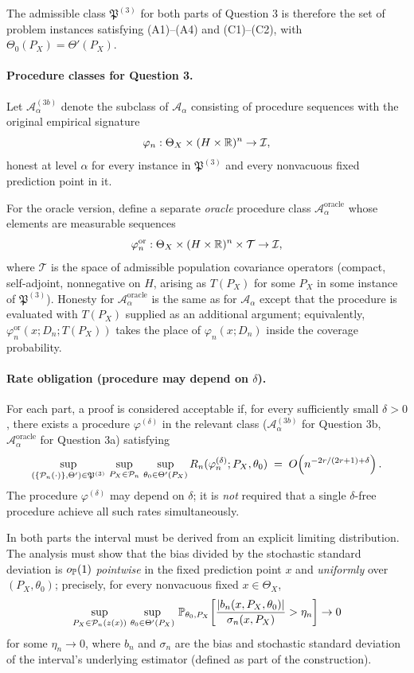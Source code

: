 \documentclass{article}
\begin{document}
The admissible class \(\mathfrak P^{(3)}\) for both parts of Question 3
is therefore the set of problem instances satisfying (A1)--(A4) and
(C1)--(C2), with \(\Theta_0(P_X)=\Theta'(P_X)\).

\paragraph{Procedure classes for Question 3.}
Let \(\mathcal A_\alpha^{(3b)}\) denote the subclass of \(\mathcal A_\alpha\)
consisting of procedure sequences with the original empirical
signature
\[
  \varphi_n:\Theta_X\times(H\times\mathbb{R})^n\to\mathcal I,
\]
honest at level \(\alpha\) for every instance in \(\mathfrak P^{(3)}\)
and every nonvacuous fixed prediction point in it.

For the oracle version, define a separate \emph{oracle} procedure
class \(\mathcal A_\alpha^{\mathrm{oracle}}\) whose elements are
measurable sequences
\[
  \varphi_n^{\mathrm{or}}:\Theta_X\times(H\times\mathbb{R})^n\times\mathcal T\to\mathcal I,
\]
where \(\mathcal T\) is the space of admissible population covariance
operators (compact, self-adjoint, nonnegative on \(H\), arising as
\(T(P_X)\) for some \(P_X\) in some instance of \(\mathfrak P^{(3)}\)).
Honesty for \(\mathcal A_\alpha^{\mathrm{oracle}}\) is the same as for
\(\mathcal A_\alpha\) except that the procedure is evaluated with
\(T(P_X)\) supplied as an additional argument; equivalently,
\(\varphi_n^{\mathrm{or}}(x;D_n;T(P_X))\) takes the place of
\(\varphi_n(x;D_n)\) inside the coverage probability.

\paragraph{Rate obligation (procedure may depend on \(\delta\)).}
For each part, a proof is considered acceptable if, for every
sufficiently small \(\delta>0\), there exists a procedure
\(\varphi^{(\delta)}\) in the relevant class
(\(\mathcal A_\alpha^{(3b)}\) for Question 3b,
\(\mathcal A_\alpha^{\mathrm{oracle}}\) for Question 3a) satisfying
\[
  \sup_{(\{\mathcal P_n(\cdot)\},\Theta')\in\mathfrak P^{(3)}}\,
  \sup_{P_X\in\mathcal P_n}\,\sup_{\theta_0\in\Theta'(P_X)}
  R_n(\varphi_n^{(\delta)};P_X,\theta_0)
  \;=\;
  O\!\left(n^{-2r/(2r+1)+\delta}\right).
\]
The procedure \(\varphi^{(\delta)}\) may depend on \(\delta\); it is
\emph{not} required that a single \(\delta\)-free procedure achieve
all such rates simultaneously.

In both parts the interval must be derived from an explicit limiting
distribution. The analysis must show that the bias divided by the
stochastic standard deviation is \(o_{\mathbb{P}}(1)\) \emph{pointwise} in
the fixed prediction point \(x\) and \emph{uniformly} over
\((P_X,\theta_0)\); precisely, for every nonvacuous fixed
\(x\in\Theta_X\),
\[
  \sup_{P_X\in\mathcal P_n(z(x))}\,\sup_{\theta_0\in\Theta'(P_X)}\,
  \mathbb{P}_{\theta_0,P_X}\!\left[
    \frac{|b_n(x,P_X,\theta_0)|}{\sigma_n(x,P_X)}>\eta_n
  \right]\to0
\]
for some \(\eta_n\to0\), where \(b_n\) and \(\sigma_n\) are the
bias and stochastic standard deviation of the interval's underlying
estimator (defined as part of the construction).
\end{document}
